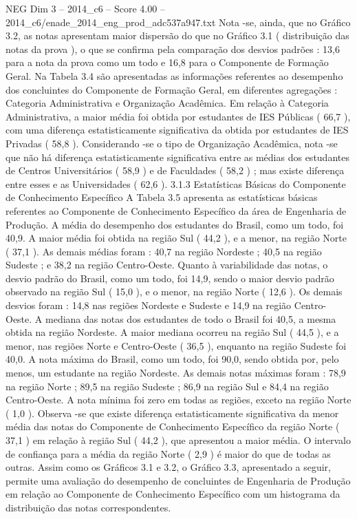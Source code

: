 \begin{textsample}{NEG Dim 3 – 2014\_c6 – Score 4.00 – 2014\_c6/enade\_2014\_eng\_prod\_adc537a947.txt}
Nota -se, ainda, que no Gráfico 3.2, as notas apresentam maior dispersão do que no Gráfico 3.1 ( distribuição das notas da prova ), o que se confirma pela comparação dos desvios padrões : 13,6 para a nota da prova como um todo e 16,8 para o Componente de Formação Geral.
Na Tabela 3.4 são apresentadas as informações referentes ao desempenho dos concluintes do Componente de Formação Geral, em diferentes agregações : Categoria Administrativa e Organização Acadêmica.
Em relação à Categoria Administrativa, a maior média foi obtida por estudantes de IES Públicas ( 66,7 ), com uma diferença estatisticamente significativa da obtida por estudantes de IES Privadas ( 58,8 ).
Considerando -se o tipo de Organização Acadêmica, nota -se que não há diferença estatisticamente significativa entre as médias dos estudantes de Centros Universitários ( 58,9 ) e de Faculdades ( 58,2 ) ; mas existe diferença entre esses e as Universidades ( 62,6 ). 3.1.3 Estatísticas Básicas do Componente de Conhecimento Específico A Tabela 3.5 apresenta as estatísticas básicas referentes ao Componente de Conhecimento Específico da área de Engenharia de Produção.
A média do desempenho dos estudantes do Brasil, como um todo, foi 40,9.
A maior média foi obtida na região Sul ( 44,2 ), e a menor, na região Norte ( 37,1 ).
As demais médias foram : 40,7 na região Nordeste ; 40,5 na região Sudeste ; e 38,2 na região Centro-Oeste.
Quanto à variabilidade das notas, o desvio padrão do Brasil, como um todo, foi 14,9, sendo o maior desvio padrão observado na região Sul ( 15,0 ), e o menor, na região Norte ( 12,6 ).
Os demais desvios foram : 14,8 nas regiões Nordeste e Sudeste e 14,9 na região Centro-Oeste.
A mediana das notas dos estudantes de todo o Brasil foi 40,5, a mesma obtida na região Nordeste.
A maior mediana ocorreu na região Sul ( 44,5 ), e a menor, nas regiões Norte e Centro-Oeste ( 36,5 ), enquanto na região Sudeste foi 40,0.
A nota máxima do Brasil, como um todo, foi 90,0, sendo obtida por, pelo menos, um estudante na região Nordeste.
As demais notas máximas foram : 78,9 na região Norte ; 89,5 na região Sudeste ; 86,9 na região Sul e 84,4 na região Centro-Oeste.
A nota mínima foi zero em todas as regiões, exceto na região Norte ( 1,0 ).
Observa -se que existe diferença estatisticamente significativa da menor média das notas do Componente de Conhecimento Específico da região Norte ( 37,1 ) em relação à região Sul ( 44,2 ), que apresentou a maior média.
O intervalo de confiança para a média da região Norte ( 2,9 ) é maior do que de todas as outras.
Assim como os Gráficos 3.1 e 3.2, o Gráfico 3.3, apresentado a seguir, permite uma avaliação do desempenho de concluintes de Engenharia de Produção em relação ao Componente de Conhecimento Específico com um histograma da distribuição das notas correspondentes.

\end{textsample}
